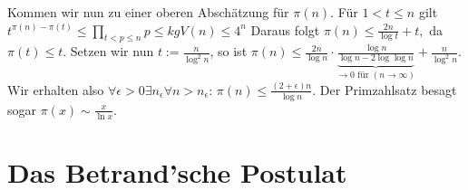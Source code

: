 Kommen wir nun zu einer oberen Abschätzung für $\pi(n)$.
Für $1 < t \le n$ gilt
\begin{math}
    t^{\pi(n) - \pi(t)} \le \prod_{t<p\le n} p
    \le kgV(n)
    \le 4^n
\end{math}
Daraus folgt
\begin{math}
    \pi(n) \le \frac{2n}{\log t} + t,
\end{math}
da $\pi(t) \le t$.
Setzen wir nun $t := \frac{n}{\log^2 n}$, so ist
\begin{math}
    \pi(n) \le \frac{2n}{\log n} \cdot \underbrace{\frac{\log n}{\log n - 2 \log\log n}}_{\to 0 \text{ für } (n \to \infty)} + \frac{n}{\log^2 n}.
\end{math}
Wir erhalten also $\forall \epsilon > 0 \exists n_\epsilon \forall n > n_\epsilon$:
\begin{math}
    \pi(n) \le \frac{(2+\epsilon)n}{\log n}.
\end{math}
Der Primzahlsatz besagt sogar
\begin{math}
    \pi(x) \sim \frac{x}{\ln x}.
\end{math}


\section{Das Betrand'sche Postulat}


